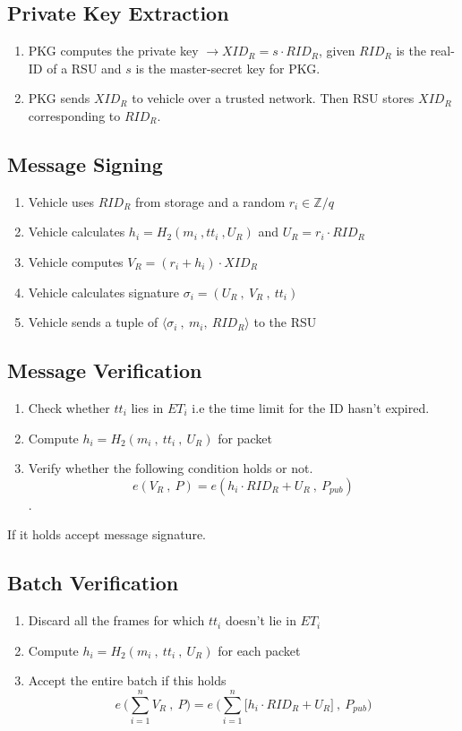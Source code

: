 \documentclass[10pt,journal,letterpaper]{IEEEtran}
\begin{document}
\subsection{Private Key Extraction}
 \begin{enumerate}

     \item PKG computes the private key $\xrightarrow{} XID_R = s \cdot RID_R$, given $RID_R$ is the real-ID of a RSU and $s$ is the master-secret key for PKG.
     \item PKG sends $XID_R$ to vehicle over a trusted network. Then RSU stores $XID_R$ corresponding to $RID_R$.
 \end{enumerate}

\subsection{Message Signing}
\begin{enumerate}
    \item Vehicle uses $RID_R$ from storage and a random $r_i \in \mathbb{Z}/q$
    \item Vehicle calculates $h_i = H_2(m_i\:,tt_i \: , U_R)$ and $U_R = r_i \cdot RID_R$
    \item Vehicle computes $V_R = (r_i+h_i) \cdot XID_R$
    \item Vehicle calculates signature $\sigma_i = (U_R\:,\:V_R\:,\:tt_i)$
    \item Vehicle sends a tuple of  $\langle\sigma_i \: , \: m_i , \: RID_R\rangle$ to the RSU
\end{enumerate}

\subsection{Message Verification}
\begin{enumerate}
    \item Check whether $tt_i$ lies in $ET_i$ i.e the time limit for the ID hasn't expired.
     \item Compute $h_i = H_2(m_i\:,\:tt_i\:,\:U_R)$ for packet
    \item Verify whether the following condition holds or not. $$e(V_R\:,\:P) = e(h_i\cdot RID_R + U_R\:,\:P_{pub}) $$.
\end{enumerate}
If it holds accept message signature.

\subsection{Batch Verification}
\begin{enumerate}
    \item Discard all the frames for which $tt_i$ doesn't lie in $ET_i$
    \item Compute $h_i = H_2(m_i\:,\:tt_i\:,\:U_R)$ for each packet
    \item Accept the entire batch if this holds \\
    $$e\:\Bigg( \sum_{i=1}^{n}V_R\:,\:P \Bigg) = e\:\Bigg(\sum_{i=1}^{n} \big[ h_i\cdot RID_R + U_R \big]\:,\:P_{pub} \Bigg) $$
\end{enumerate}
\end{document}
